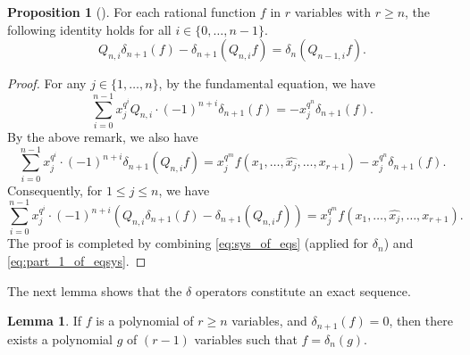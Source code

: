 \documentclass[12pt,a4paper]{report}
\theoremstyle{definition}
\newtheorem{proposition}[theorem]{Proposition}
\newtheorem{lemma}[theorem]{Lemma}
\theoremstyle{remark}
\theoremstyle{definition}
\begin{document}
\begin{proposition}[{\cite{ha_hai_nghia_GL}}]\label{prop:commutator}
    For each rational function $f$ in $r$ variables with $r\geq n$, the following identity holds for all $i\in \{0, \ldots, n-1\}$.
    \begin{equation}\label{eq:commutator}
        Q_{n, i}\delta_{n+1}(f) - \delta_{n+1}(Q_{n,i}f) = \delta_{n}(Q_{n-1, i}f).
    \end{equation}
\end{proposition}
\begin{proof}
    For any $j\in \{1, \ldots, n\}$, by the fundamental equation, we have
    \begin{equation*}
        \sum\limits_{i=0}^{n-1}x_j^{q^i}Q_{n, i}\cdot (-1)^{n+i}\delta_{n+1}(f) = -x_j^{q^n}\delta_{n+1}(f).
    \end{equation*}
    By the above remark, we also have
    \begin{equation*}
        \sum\limits_{i=0}^{n-1}x_j^{q^i}\cdot (-1)^{n+i}\delta_{n+1}(Q_{n, i} f) = x_j^{q^m}f(x_1, \ldots, \widehat{x_j}, \ldots, x_{r+1}) - x_j^{q^n}\delta_{n+1}(f).
    \end{equation*}
    Consequently, for $1\leq j\leq n$, we have
    \begin{equation}\label{eq:part_1_of_eqsys}
        \sum\limits_{i=0}^{n-1}x_j^{q^i}\cdot (-1)^{n+i}(Q_{n, i}\delta_{n+1}(f)-\delta_{n+1}(Q_{n, i} f)) = x_j^{q^m}f(x_1, \ldots, \widehat{x_j}, \ldots, x_{r+1}).
    \end{equation}
    The proof is completed by combining \eqref{eq:sys_of_eqs} (applied for $\delta_n$) and \eqref{eq:part_1_of_eqsys}. 
\end{proof}
The next lemma shows that the $\delta$ operators constitute an exact sequence.
\begin{lemma}
    \label{lemma:exactness}
If $f$ is a polynomial of $r\geq n$ variables, and $\delta_{n+1}(f) = 0$, then there exists a polynomial $g$ of $(r-1)$ variables such that $f = \delta_n(g)$. 
\end{lemma}
\end{document}
